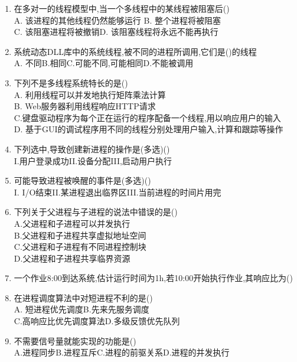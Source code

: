 \documentclass[12pt, a4paper, oneside, UTF8]{ctexbook}
\begin{document}
\begin{enumerate}
    \item 在多对一的线程模型中,当一个多线程中的某线程被阻塞后() \\
    A. 该进程的其他线程仍然能够运行 \qquad B. 整个进程将被阻塞 \\
    C. 该阻塞进程将被撤销\qquad D. 该阻塞线程将永远不能再执行 

    \item 系统动态DLL库中的系统线程,被不同的进程所调用,它们是()的线程 \\
    A. 不同\qquad B.相同\qquad C.可能不同,可能相同\qquad D.不能被调用

    \item 下列不是多线程系统特长的是() \\
    A. 利用线程可以并发地执行矩阵乘法计算 \\
    B. Web服务器利用线程响应HTTP请求 \\
    C.键盘驱动程序为每个正在运行的程序配备一个线程,用以响应用户的输入 \\
    D. 基于GUI的调试程序用不同的线程分别处理用户输入,计算和跟踪等操作

    \item 下列选中,导致创建新进程的操作是(多选)() \\
    I.用户登录成功\qquad II.设备分配\qquad III,启动用户执行

    \item 可能导致进程被唤醒的事件是(多选)() \\
    I. I/O结束\qquad II.某进程退出临界区\qquad III.当前进程的时间片用完 

    \item 下列关于父进程与子进程的说法中错误的是() \\
    A.父进程和子进程可以并发执行 \\
    B.父进程和子进程共享虚拟地址空间 \\
    C.父进程和子进程有不同进程控制块 \\
    D.父进程和子进程共享临界资源

    \item 一个作业8:00到达系统,估计运行时间为1h,若10:00开始执行作业,其响应比为()

    \item 在进程调度算法中对短进程不利的是() \\
    A. 短进程优先调度\qquad B.先来先服务调度 \\
    C.高响应比优先调度算法\qquad D.多级反馈优先队列

    \item 不需要信号量就能实现的功能是() \\
    A.进程同步\qquad B.进程互斥\qquad C.进程的前驱关系\qquad D.进程的并发执行


\end{enumerate}
\end{document}
